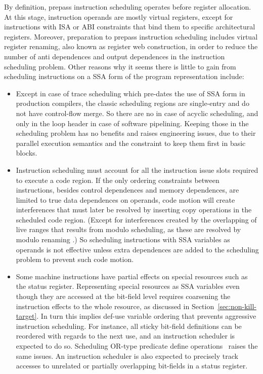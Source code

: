 By definition, prepass instruction scheduling operates before register
allocation. At this stage, instruction operands are mostly virtual registers,
except for instructions with ISA or ABI constraints that bind them to specific
architectural registers. Moreover, preparation to prepass instruction
scheduling includes virtual register renaming, also known as register web
construction, in order to reduce the number of anti dependences and output
dependences in the instruction scheduling problem. Other reasons why it seems
there is little to gain from scheduling instructions on a SSA form of the program
representation include: \begin{itemize}

\item Except in case of trace scheduling which pre-dates the use of SSA form in
production compilers, the classic scheduling regions are single-entry and do not
have control-flow merge. So there are no \phifuns in case of acyclic
scheduling, and only \phifuns in the loop header in case of software
pipelining. Keeping those \phifuns in the scheduling problem has no
benefits and raises engineering issues, due to their parallel execution
semantics and the constraint to keep them first in basic blocks.

\item Instruction scheduling must account for all the instruction issue slots
required to execute a code region. If the only ordering constraints between
instructions, besides control dependences and memory dependences, are limited to
true data dependences on operands, code motion will create interferences that
must later be resolved by inserting copy operations in the scheduled code
region. (Except for interferences created by the overlapping of live ranges
that results from modulo scheduling, as these are resolved by modulo renaming
\cite{Lam:1988:PLDI}.) So scheduling instructions with SSA variables as operands
is not effective unless extra dependences are added to the scheduling problem to
prevent such code motion. 

\item Some machine instructions have partial effects on special resources such
as the status register. Representing special resources as SSA variables even
though they are accessed at the bit-field level requires coarsening the
instruction effects to the whole resource, as discussed in
Section~\ref{sec:non-kill-target}. In turn this implies def-use variable
ordering that prevents aggressive instruction scheduling. For instance, all
{sticky} bit-field definitions can be reordered with regards to the next use,
and an instruction scheduler is expected to do so. Scheduling OR-type predicate
define operations~\cite{Schlansker:1999:PLDI} raises the same issues.  An
instruction scheduler is also expected to precisely track accesses to unrelated
or partially overlapping bit-fields in a status register.


\end{itemize}
